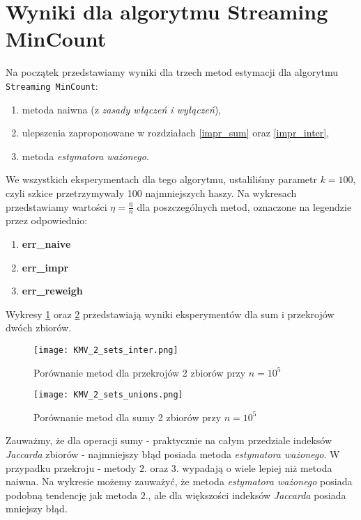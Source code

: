 \section{Wyniki dla algorytmu Streaming MinCount}
Na początek przedstawiamy wyniki dla trzech metod estymacji dla algorytmu \texttt{Streaming MinCount}:
\begin{enumerate}
	\item metoda naiwna (z \textit{zasady włączeń i wyłączeń}),
	\item ulepszenia zaproponowane w rozdziałach \ref{impr_sum} oraz \ref{impr_inter},
	\item metoda \textit{estymatora ważonego}.
\end{enumerate}
We wszystkich eksperymentach dla tego algorytmu, ustaliliśmy parametr $k = 100$, czyli szkice przetrzymywały 100 najmniejszych haszy.
Na wykresach przedstawiamy wartości $\eta = \frac{\hat{n}}{n}$ dla poszczególnych metod, oznaczone na legendzie przez odpowiednio:
\begin{enumerate}
	\item \textbf{err\_naive}
	\item \textbf{err\_impr}
	\item \textbf{err\_reweigh}
\end{enumerate}
Wykresy \ref{fig:KMV_2sets_inter} oraz \ref{fig:KMV_2sets_unions} przedstawiają wyniki eksperymentów dla sum i przekrojów dwóch zbiorów.

\begin{figure}[h!]
    \texttt{[image: KMV\_2\_sets\_inter.png]}
    \centering
    \caption{Porównanie metod dla przekrojów 2 zbiorów przy $n=10^5$}
    \label{fig:KMV_2sets_inter}
\end{figure}

\begin{figure}[h!]
    \texttt{[image: KMV\_2\_sets\_unions.png]}
    \centering
    \caption{Porównanie metod dla sumy 2 zbiorów przy $n=10^5$}
    \label{fig:KMV_2sets_unions}
\end{figure}

Zauważmy, że dla operacji sumy - praktycznie na całym przedziale indeksów \textit{Jaccarda} zbiorów - najmniejszy błąd posiada metoda \textit{estymatora ważonego}. W przypadku przekroju - metody $2.$ oraz $3.$ wypadają o wiele lepiej niż metoda naiwna. Na wykresie możemy zauważyć, że metoda \textit{estymatora ważonego} posiada podobną tendencję jak metoda $2.$, ale dla większości indeksów \textit{Jaccarda} posiada mniejszy błąd.

